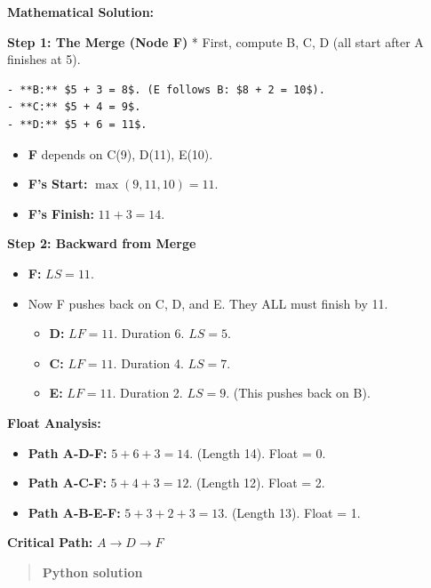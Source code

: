 \documentclass[
  letterpaper,
  DIV=11,
  numbers=noendperiod]{scrreprt}
\providecommand{\tightlist}{%
  \setlength{\itemsep}{0pt}\setlength{\parskip}{0pt}}
\begin{document}
\textbf{Mathematical Solution:}

\textbf{Step 1: The Merge (Node F)} * First, compute B, C, D (all start
after A finishes at 5).

\begin{verbatim}
- **B:** $5 + 3 = 8$. (E follows B: $8 + 2 = 10$).
- **C:** $5 + 4 = 9$.
- **D:** $5 + 6 = 11$.
\end{verbatim}

\begin{itemize}
\tightlist
\item
  \textbf{F} depends on C(9), D(11), E(10).
\item
  \textbf{F's Start:} \(\max(9, 11, 10) = 11\).
\item
  \textbf{F's Finish:} \(11 + 3 = 14\).
\end{itemize}

\textbf{Step 2: Backward from Merge}

\begin{itemize}
\item
  \textbf{F:} \(LS = 11\).
\item
  Now F pushes back on C, D, and E. They ALL must finish by 11.

  \begin{itemize}
  \tightlist
  \item
    \textbf{D:} \(LF=11\). Duration 6. \(LS = 5\).
  \item
    \textbf{C:} \(LF=11\). Duration 4. \(LS = 7\).
  \item
    \textbf{E:} \(LF=11\). Duration 2. \(LS = 9\). (This pushes back on
    B).
  \end{itemize}
\end{itemize}

\textbf{Float Analysis:}

\begin{itemize}
\tightlist
\item
  \textbf{Path A-D-F:} \(5+6+3=14\). (Length 14). Float = 0.
\item
  \textbf{Path A-C-F:} \(5+4+3=12\). (Length 12). Float = 2.
\item
  \textbf{Path A-B-E-F:} \(5+3+2+3=13\). (Length 13). Float = 1.
\end{itemize}

\textbf{Critical Path:} \(A \to D \to F\)

\begin{quote}
\textbf{Python solution}
\end{quote}
\end{document}
